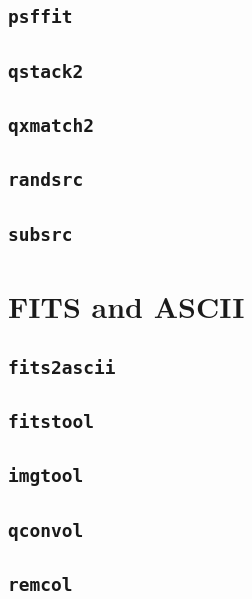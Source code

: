\documentclass[12pt]{report}
\begin{document}
\subsection{\texttt{psffit}} 
\subsection{\texttt{qstack2}} 
\subsection{\texttt{qxmatch2}} 
\subsection{\texttt{randsrc}} 
\subsection{\texttt{subsrc}} 

\section{FITS and ASCII \label{SEC:tool:fits}}
\subsection{\texttt{fits2ascii}} 
\subsection{\texttt{fitstool}} 
\subsection{\texttt{imgtool}} 
\subsection{\texttt{qconvol}} 
\subsection{\texttt{remcol}} 


\printindex
\end{document}
